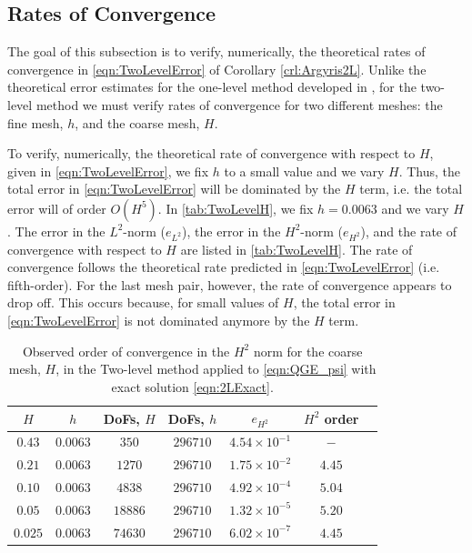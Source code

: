 \subsection{Rates of Convergence}\label{sse:Rates}
The goal of this subsection is to verify, numerically, the theoretical rates of
convergence in \eqref{eqn:TwoLevelError} of Corollary \ref{crl:Argyris2L}. Unlike
the theoretical error estimates for the one-level method developed in
\cite{Foster}, for the two-level method we must verify rates of convergence
for two different meshes: the fine mesh, $h$, and the coarse mesh, $H$.

To verify, numerically, the theoretical rate of convergence with respect to $H$,
given in \eqref{eqn:TwoLevelError}, we fix $h$ to a small value and we vary $H$.
Thus, the total error in \eqref{eqn:TwoLevelError} will be dominated by the $H$
term, i.e. the total error will of order $O(H^5)$. In \autoref{tab:TwoLevelH},
we fix $h=0.0063$ and we vary $H$. The error in the $L^2$-norm ($e_{L^2}$), the
error in the $H^2$-norm ($e_{H^2}$), and the rate of convergence with respect to
$H$ are listed in \autoref{tab:TwoLevelH}. The rate of convergence follows the
theoretical rate predicted in \eqref{eqn:TwoLevelError} (i.e. fifth-order). For the
last mesh pair, however, the rate of convergence appears to drop off. This
occurs because, for small values of $H$, the total error in
\eqref{eqn:TwoLevelError} is not dominated anymore by the $H$ term.
\begin{table}
  \begin{center}
    \begin{tabular}{|c|c|c|c|c|c|c|}
    \hline
      $H$ &   $h$ &   DoFs, $ H $ & DoFs, $ h $ & $e_{H^2}$ & $H^2$ order \\
      \hline
      $0.43$ & $0.0063$ & $350$ & $296710$ & $4.54\times 10^{-1}$ & $-$ \\
      $0.21$ & $0.0063$ & $1270$ & $296710$ & $1.75\times 10^{-2}$ & $4.45$ \\
      $0.10$ & $0.0063$ & $4838$ & $296710$ & $4.92\times 10^{-4}$ & $5.04$ \\
      $0.05$ & $0.0063$ & $18886$ & $296710$ & $1.32\times 10^{-5}$ & $5.20$ \\
      $0.025$ & $0.0063$ & $74630$ & $296710$ & $6.02\times 10^{-7}$ & $4.45$ \\
      \hline
    \end{tabular}
  \end{center}
  \caption{Observed order of convergence in the $H^2$ norm for the coarse mesh,
    $H$, in the Two-level method applied to \eqref{eqn:QGE_psi} with exact
    solution \eqref{eqn:2LExact}.}
  \label{tab:TwoLevelH}
\end{table}

